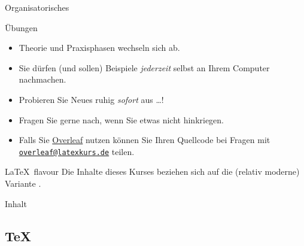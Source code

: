 \documentclass[
	vorläufig=false,
	datum=2023-02-17,
	titel={erster Tag},
	kursA,
]{../tex/latexkurs-slides}
\begin{document}
\begin{frame}[t]{Organisatorisches}
	\begin{block}{Übungen}
		\begin{itemize}
			\item Theorie und Praxisphasen wechseln sich ab.
			\item Sie dürfen (und sollen) Beispiele \emph{jederzeit} selbst an Ihrem Computer nachmachen.
			\item Probieren Sie Neues ruhig \emph{sofort} aus …!
			\item Fragen Sie gerne nach, wenn Sie etwas nicht hinkriegen.
			\item Falls Sie \href{https://www.overleaf.com?r=60500875&rm=d&rs=b}{Overleaf} nutzen können Sie Ihren Quellcode bei Fragen mit \href{mailto:overleaf@latexkurs.de}{\texttt{overleaf@latexkurs.de}} teilen.
		\end{itemize}
	\end{block}
		\begin{block}{\LaTeX\ flavour}
			Die Inhalte dieses Kurses beziehen sich auf die (relativ moderne) Variante .
		\end{block}
\end{frame}


\begin{frame}[t,allowframebreaks]{Inhalt}
	\tableofcontents
\end{frame}

\subsection*{\TeX}
\end{document}

